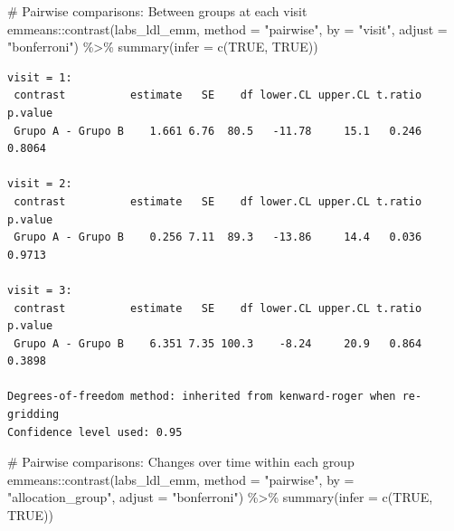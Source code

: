 \documentclass[
  letterpaper,
  DIV=11,
  numbers=noendperiod]{scrartcl}
\newenvironment{Shaded}{\begin{snugshade}}{\end{snugshade}}
\newcommand{\AttributeTok}[1]{\textcolor[rgb]{0.40,0.45,0.13}{#1}}
\newcommand{\CommentTok}[1]{\textcolor[rgb]{0.37,0.37,0.37}{#1}}
\newcommand{\ConstantTok}[1]{\textcolor[rgb]{0.56,0.35,0.01}{#1}}
\newcommand{\FunctionTok}[1]{\textcolor[rgb]{0.28,0.35,0.67}{#1}}
\newcommand{\NormalTok}[1]{\textcolor[rgb]{0.00,0.23,0.31}{#1}}
\newcommand{\SpecialCharTok}[1]{\textcolor[rgb]{0.37,0.37,0.37}{#1}}
\newcommand{\StringTok}[1]{\textcolor[rgb]{0.13,0.47,0.30}{#1}}
\begin{document}
\begin{Shaded}
\begin{Highlighting}[]
\CommentTok{\# Pairwise comparisons: Between groups at each visit}
\NormalTok{emmeans}\SpecialCharTok{::}\FunctionTok{contrast}\NormalTok{(labs\_ldl\_emm, }\AttributeTok{method =} \StringTok{"pairwise"}\NormalTok{, }\AttributeTok{by =} \StringTok{"visit"}\NormalTok{, }\AttributeTok{adjust =} \StringTok{"bonferroni"}\NormalTok{) }\SpecialCharTok{\%\textgreater{}\%} \FunctionTok{summary}\NormalTok{(}\AttributeTok{infer =} \FunctionTok{c}\NormalTok{(}\ConstantTok{TRUE}\NormalTok{, }\ConstantTok{TRUE}\NormalTok{))}
\end{Highlighting}
\end{Shaded}

\begin{verbatim}
visit = 1:
 contrast          estimate   SE    df lower.CL upper.CL t.ratio p.value
 Grupo A - Grupo B    1.661 6.76  80.5   -11.78     15.1   0.246  0.8064

visit = 2:
 contrast          estimate   SE    df lower.CL upper.CL t.ratio p.value
 Grupo A - Grupo B    0.256 7.11  89.3   -13.86     14.4   0.036  0.9713

visit = 3:
 contrast          estimate   SE    df lower.CL upper.CL t.ratio p.value
 Grupo A - Grupo B    6.351 7.35 100.3    -8.24     20.9   0.864  0.3898

Degrees-of-freedom method: inherited from kenward-roger when re-gridding 
Confidence level used: 0.95 
\end{verbatim}

\begin{Shaded}
\begin{Highlighting}[]
\CommentTok{\# Pairwise comparisons: Changes over time within each group}
\NormalTok{emmeans}\SpecialCharTok{::}\FunctionTok{contrast}\NormalTok{(labs\_ldl\_emm, }\AttributeTok{method =} \StringTok{"pairwise"}\NormalTok{, }\AttributeTok{by =} \StringTok{"allocation\_group"}\NormalTok{, }\AttributeTok{adjust =} \StringTok{"bonferroni"}\NormalTok{) }\SpecialCharTok{\%\textgreater{}\%} \FunctionTok{summary}\NormalTok{(}\AttributeTok{infer =} \FunctionTok{c}\NormalTok{(}\ConstantTok{TRUE}\NormalTok{, }\ConstantTok{TRUE}\NormalTok{))}
\end{Highlighting}
\end{Shaded}
\end{document}
